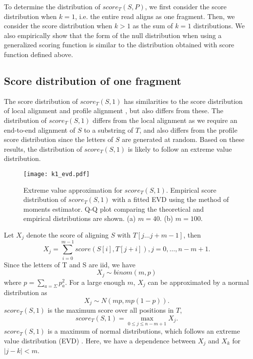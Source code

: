 To determine the distribution of $score_T(S, P)$, we first consider the score
distribution when $k = 1$, i.e. the entire read aligns as one fragment.
Then, we consider the score distribution when $k > 1$ as the sum of $k =
1$ distributions. We also empirically show that the form of the null
distribution when using a generalized scoring function is similar to the
distribution obtained with score function defined above.

\subsection{Score distribution of one fragment}
The score distribution of $score_T(S,1)$ has similarities to the score
distribution of local alignment \citep{} and profile alignment \citep{},
but also differs from these.  The distribution of $score_T(S,1)$ differs
from the local alignment as we require an end-to-end alignment of $S$ to
a substring of $T$, and also differs from the profile score distribution
since the letters of $S$ are generated at random.
Based on these results, the distribution of $score_T(S,1)$ is likely to
follow an extreme value distribution.

\begin{figure}[t!]
\centering
\texttt{[image: k1\_evd.pdf]}
\caption[Extreme value distribution approximation for $score_T(S,1)$]{
  Extreme value approximation for $score_T(S,1)$.
  Empirical score distribution of $score_T(S,1)$ with a fitted
  EVD using the method of moments estimator.
  Q-Q plot comparing the theoretical and empirical distributions are shown.
  (a) $m=40$.
  (b) $m=100$.}
\label{evd_approx}
\end{figure}

Let $X_j$ denote the score of aligning $S$ with $T[j \dots j+m-1]$, then
\[X_j = \sum_{i=0}^{m-1} score(S[i],T[j+i]), j = 0, \dots, n-m+1.\]
Since the letters of T and S are iid, we have \[X_j \sim binom(m,p)\]
where $p = \sum_{a=\Sigma} p_a^2$.  For a large enough $m$, $X_j$ can
be approximated by a normal distribution as \[X_j \sim N(mp, mp(1-p)).
\] $score_T(S,1)$ is the maximum score over all positions in $T$,
\[score_T(S,1) = \max_{0 \leq j \leq n-m+1} X_j.\] $score_T(S,1)$ is a
maximum of normal distributions, which follows an extreme value
distribution (EVD) \citep{kotz2000extreme}.
Here, we have a dependence between $X_j$ and $X_k$ for $|j - k| < m$.

